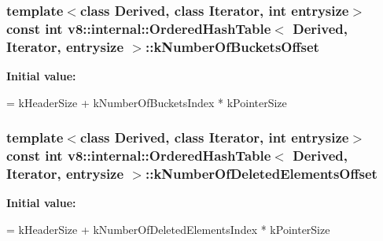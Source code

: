 \subsubsection[{\texorpdfstring{k\+Number\+Of\+Buckets\+Offset}{kNumberOfBucketsOffset}}]{\setlength{\rightskip}{0pt plus 5cm}template$<$class Derived, class Iterator, int entrysize$>$ const int {\bf v8\+::internal\+::\+Ordered\+Hash\+Table}$<$ Derived, Iterator, entrysize $>$\+::k\+Number\+Of\+Buckets\+Offset\hspace{0.3cm}{\ttfamily [static]}}\hypertarget{classv8_1_1internal_1_1_ordered_hash_table_aa340235efec60025c50abd71c7c641f3}{}\label{classv8_1_1internal_1_1_ordered_hash_table_aa340235efec60025c50abd71c7c641f3}
{\bfseries Initial value\+:}
\begin{DoxyCode}
=
      kHeaderSize + kNumberOfBucketsIndex * kPointerSize
\end{DoxyCode}
\subsubsection[{\texorpdfstring{k\+Number\+Of\+Deleted\+Elements\+Offset}{kNumberOfDeletedElementsOffset}}]{\setlength{\rightskip}{0pt plus 5cm}template$<$class Derived, class Iterator, int entrysize$>$ const int {\bf v8\+::internal\+::\+Ordered\+Hash\+Table}$<$ Derived, Iterator, entrysize $>$\+::k\+Number\+Of\+Deleted\+Elements\+Offset\hspace{0.3cm}{\ttfamily [static]}}\hypertarget{classv8_1_1internal_1_1_ordered_hash_table_a290f8fb40ae864e6c385cae6d1ffbfa2}{}\label{classv8_1_1internal_1_1_ordered_hash_table_a290f8fb40ae864e6c385cae6d1ffbfa2}
{\bfseries Initial value\+:}
\begin{DoxyCode}
=
      kHeaderSize + kNumberOfDeletedElementsIndex * kPointerSize
\end{DoxyCode}
